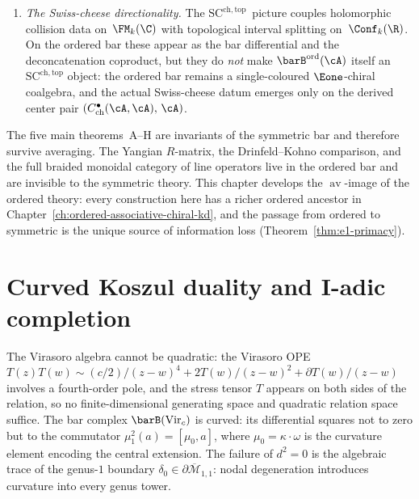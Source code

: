 \begin{remark}
\begin{enumerate}[label=\textup{(\roman*)}]
 coproduct on $\barB^{\mathrm{ord}}(\cA)$ controls the tensor
 product on the category of ordered factorization modules
 $\Factord(\cA)$.  A Yang--Baxter operator together with factorization
 descent supplies the braiding, and the symmetric descent records its
 homotopy-coinvariant realization.
\item \emph{The Swiss-cheese directionality.} The
 $\mathrm{SC}^{\mathrm{ch},\mathrm{top}}$~picture couples
 holomorphic collision data on~$\FM_k(\C)$ with topological
 interval splitting on~$\Conf_k(\R)$. On the ordered bar these
 appear as the bar differential and the deconcatenation
 coproduct, but they do \emph{not} make
 $\barB^{\mathrm{ord}}(\cA)$ itself an
 $\mathrm{SC}^{\mathrm{ch},\mathrm{top}}$ object: the ordered
 bar remains a single-coloured $\Eone$-chiral coalgebra, and the
 actual Swiss-cheese datum emerges only on the derived center
 pair $(C^\bullet_{\mathrm{ch}}(\cA,\cA),\,\cA)$.
\end{enumerate}
The five main theorems~A--H are invariants of the symmetric bar
and therefore survive averaging. The Yangian $R$-matrix, the
Drinfeld--Kohno comparison, and the full braided monoidal category
of line operators live in the ordered bar and are invisible to the
symmetric theory. This chapter develops the $\operatorname{av}$-image
of the ordered theory: every construction here has a richer ordered
ancestor in Chapter~\ref{ch:ordered-associative-chiral-kd}, and the
passage from ordered to symmetric is the unique source of information
loss \textup{(}Theorem~\ref{thm:e1-primacy}\textup{)}.
\end{remark}

\section{Curved Koszul duality and I-adic completion}
\label{sec:curved-koszul-i-adic}

The Virasoro algebra cannot be quadratic: the Virasoro OPE
$T(z)T(w) \sim (c/2)/(z-w)^4 + 2T(w)/(z-w)^2 + \partial T(w)/(z-w)$
involves a fourth-order pole, and the stress tensor $T$ appears on
both sides of the relation, so no finite-dimensional generating space
and quadratic relation space suffice. The bar complex
$\barB(\mathrm{Vir}_c)$ is curved: its
differential squares not to zero but to the commutator
$\mu_1^2(a) = [\mu_0, a]$, where $\mu_0 = \kappa \cdot \omega$ is
the curvature element encoding the central extension. The failure
of $d^2=0$ is the algebraic trace of the
genus-$1$ boundary $\delta_0 \in \partial\overline{\mathcal{M}}_{1,1}$:
nodal degeneration introduces curvature into every genus
tower.

